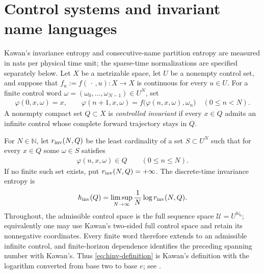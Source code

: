 \documentclass[11pt,reqno]{amsart}
\numberwithin{equation}{section}
\theoremstyle{definition}
\newcommand{\N}{\mathbb N}
\newcommand{\Nzero}{\mathbb N_0}
\newcommand{\hinv}{h_{\mathrm{inv}}}
\begin{document}
\section{Control systems and invariant name languages}\label{sec:control}

Kawan's invariance entropy and consecutive-name partition entropy are measured in nats
per physical time unit; the sparse-time normalizations are specified
separately below.  Let $X$ be a
metrizable space, let $U$ be a nonempty control set, and suppose that
$f_u:=f(\,\cdot\,,u):X\to X$ is continuous for every $u\in U$.  For a finite
control word $\omega=(\omega_0,\ldots,\omega_{N-1})\in U^N$, set
\begin{align*}
 \varphi(0,x,\omega)=x,
 \qquad
 \varphi(n+1,x,\omega)
 =f\bigl(\varphi(n,x,\omega),\omega_n\bigr)
 \quad(0\le n<N).
\end{align*}
A nonempty compact set $Q\subset X$ is \emph{controlled invariant} if every
$x\in Q$ admits an infinite control whose complete forward trajectory stays in
$Q$.

For $N\in\N$, let $r_{\rm inv}(N,Q)$ be the least cardinality of a set
$S\subset U^N$ such that for every $x\in Q$ some $\omega\in S$ satisfies
\begin{align*}
 \varphi(n,x,\omega)\in Q\qquad(0\le n\le N).
\end{align*}
If no finite such set exists, put $r_{\rm inv}(N,Q)=+\infty$.  The
discrete-time invariance entropy is
\begin{equation}\label{eq:hinv-definition}
 \hinv(Q)=\limsup_{N\to\infty}\frac1N\log r_{\rm inv}(N,Q).
\end{equation}
Throughout, the admissible control space is the full sequence space
$\mathcal U=U^{\Nzero}$; equivalently one may use Kawan's two-sided full
control space and retain its nonnegative coordinates.  Every finite word
therefore extends to an admissible infinite control, and finite-horizon
dependence identifies the preceding spanning number with Kawan's.  Thus
\eqref{eq:hinv-definition} is Kawan's definition with the logarithm converted
from base two to base $e$; see \cite[Definition~2.2, p.~44]{Kawan2013}.
\end{document}

